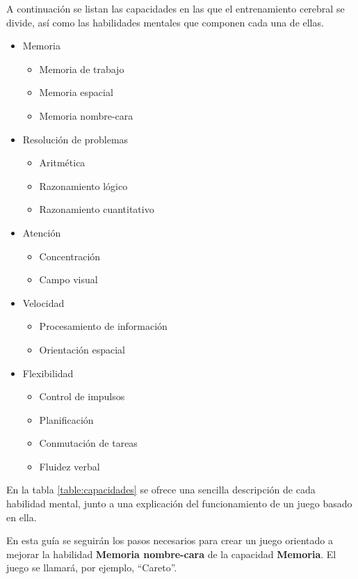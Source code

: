A continuación se listan las capacidades en las que el entrenamiento cerebral se divide, así como las habilidades mentales que componen cada una de ellas.

\begin{itemize}
\item Memoria
  \begin{itemize}
  \item Memoria de trabajo
  \item Memoria espacial
  \item Memoria nombre-cara
  \end{itemize}

\item Resolución de problemas
  \begin{itemize}
  \item Aritmética
  \item Razonamiento lógico
  \item Razonamiento cuantitativo
  \end{itemize}

\item Atención
  \begin{itemize}
  \item Concentración
  \item Campo visual
  \end{itemize}

\item Velocidad
  \begin{itemize}
  \item Procesamiento de información
  \item Orientación espacial
  \end{itemize}

\item Flexibilidad
  \begin{itemize}
  \item Control de impulsos
  \item Planificación
  \item Conmutación de tareas
  \item Fluidez verbal
  \end{itemize}
\end{itemize}

En la tabla \ref{table:capacidades} se ofrece una sencilla descripción de cada habilidad mental, junto a una explicación del funcionamiento de un juego basado en ella.

En esta guía se seguirán los pasos necesarios para crear un juego orientado a mejorar la habilidad {\bf Memoria nombre-cara} de la capacidad {\bf Memoria}. El juego se llamará, por ejemplo, ``Careto''.

